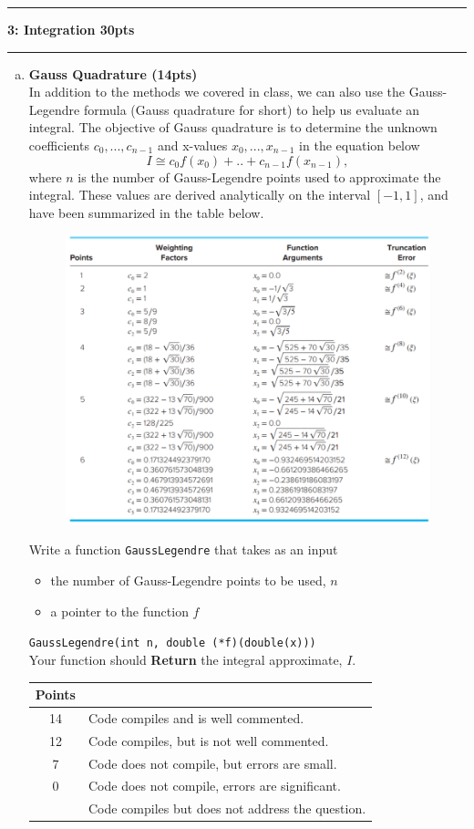 \documentclass[11pt]{article}
\newcommand\question[2]{\vspace{.25in}\hrule\textbf{#1: #2}\vspace{.5em}\hrule\vspace{.10in}}
\begin{document}
\question{3}{Integration \color{red}30pts}
\begin{enumerate}[(a)]
	\item \textbf{Gauss Quadrature \color{red}(14pts)}\\
	In addition to the methods we covered in class, we can also use the Gauss-Legendre formula (Gauss quadrature for short) to help us evaluate an integral. The objective of Gauss quadrature is to determine the unknown coefficients $c_0,...,c_{n-1}$ and x-values $x_0,...,x_{n-1}$ in the equation below 
	$$I \cong c_0f(x_0)+..+c_{n-1}f(x_{n-1}),$$
	where $n$ is the number of Gauss-Legendre points used to approximate the integral. These values are derived analytically on the interval $[-1,1]$, and have been summarized in the table below.
	\begin{figure}[H]
		\centering
		\includegraphics[width=.8\textwidth]{Integration}
	\end{figure}
	Write a function \texttt{GaussLegendre} that takes as an input
	\begin{itemize}
		\item the number of Gauss-Legendre points to be used, $n$ 
		\item a pointer to the function $f$
	\end{itemize}
	\texttt{GaussLegendre(int n, double (*f)(double(x)))}\\
	Your function should \textbf{Return} the integral approximate, $I$.
		\begin{table}[H]
		\centering
		\color{red}
		\begin{tabular}{| c | l |}
			\hline
			Points & \\
			\hline
			14 & Code compiles and is well commented. \\
			\hline
			12 & Code compiles, but is not well commented. \\
			\hline
			7 & Code does not compile, but errors are small. \\
			\hline
			0 & Code does not compile, errors are significant. \\
			& Code compiles but does not address the question.\\
			\hline
		\end{tabular}
	\end{table}
	
\end{enumerate}
\end{document}

